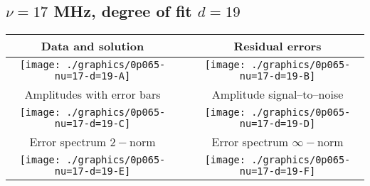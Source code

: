 

% 

\clearpage{}
\break{}

\subsection{$\nu = 17$ MHz, degree of fit $d = 19$}

\begin{table}[h]
    \begin{center}
        \begin{tabular}{ccc}
            Data and solution & \quad & Residual errors \\\hline
            \texttt{[image: ./graphics/0p065-nu=17-d=19-A]} &&
            \texttt{[image: ./graphics/0p065-nu=17-d=19-B]} \\[15pt]
            Amplitudes with error bars && Amplitude signal--to--noise \\\hline
            \texttt{[image: ./graphics/0p065-nu=17-d=19-C]} &&
            \texttt{[image: ./graphics/0p065-nu=17-d=19-D]} \\[15pt]
            Error spectrum $2-$norm && Error spectrum $\infty-$norm \\\hline
            \texttt{[image: ./graphics/0p065-nu=17-d=19-E]} &&
            \texttt{[image: ./graphics/0p065-nu=17-d=19-F]} \\[15pt]
        \end{tabular}
    \end{center}
\label{fig:elev=65, nu=17}
\end{table}



\endinput
